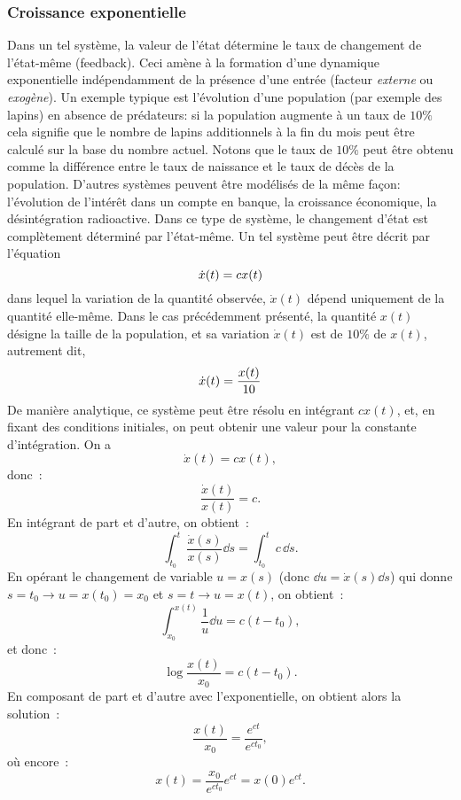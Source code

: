             \subsubsection{Croissance exponentielle}
                Dans un tel système, la valeur de l'état détermine le taux de changement de l'état-même (feedback). Ceci amène à la formation d'une dynamique exponentielle indépendamment de la présence d'une entrée (facteur \textit{externe} ou \textit{exogène}). Un exemple typique est l'évolution d'une population (par exemple des lapins) en absence de prédateurs: si la population augmente à un taux de $10\%$ cela signifie que le nombre de lapins additionnels à la fin du mois peut être calculé sur la base du nombre actuel. Notons que le taux de $10\%$ peut être obtenu comme la différence entre le taux de naissance et le taux de décès de la population. D'autres systèmes peuvent être modélisés de la même façon: l'évolution de l'intérêt dans un compte en banque, la croissance économique, la désintégration radioactive. Dans ce type de système, le changement d'état est complètement déterminé par l'état-même. Un tel système peut être décrit par l'équation
                \begin{equation}
                    \dot{x}(t)=cx(t)\\
                \end{equation}
                dans lequel la variation de la quantité observée, $\dot{x}(t)$ dépend uniquement de la quantité elle-même. Dans le cas précédemment présenté, la quantité $x(t)$ désigne la taille de la population, et sa variation $\dot{x}(t)$ est de $10\%$ de $x(t)$, autrement dit,
                \begin{equation}
                    \dot{x}(t)=\frac{x(t)}{10}\\
                \end{equation}
                De manière analytique, ce système peut être résolu en intégrant $c x(t)$, et, en fixant des conditions initiales, on peut obtenir une valeur pour la constante d'intégration.
                On a
                \[\dot x(t) = cx(t),\]
                donc~:
                \[\frac {\dot x(t)}{x(t)} = c.\]
                En intégrant de part et d'autre, on obtient~:
                \[\int_{t_0}^t\frac {\dot x(s)}{x(s)}\dd s = \int_{t_0}^t c\,\dd s.\]
                En opérant le changement de variable $u = x(s)$ (donc $\dd u = \dot x(s)\dd s$) qui donne $s=t_0 \rightarrow u = x(t_0) = x_0$ et $s=t \rightarrow u=x(t)$, on obtient~:
                \[\int_{x_0}^{x(t)}\frac 1u \dd u = c(t - t_0),\]
                et donc~:
                \[\log \frac {x(t)}{x_0} = c(t - t_0).\]
                En composant de part et d'autre avec l'exponentielle, on obtient alors la solution~:
                \[\frac {x(t)}{x_0} = \frac {e^{ct}}{e^{ct_0}},\]
                où encore~:
                \[x(t) = \frac {x_0}{e^{ct_0}}e^{ct} = x(0)e^{ct}.\]
                
